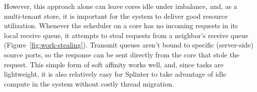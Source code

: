 However, this approach alone can leave cores idle under imbalance, and, as a multi-tenant
  store, it is important for the system to deliver good resource utilization.
Whenever the scheduler on a core has no
  incoming requests in its local receive queue, it attempts to steal requests
  from a neighbor's receive queue (Figure~\ref{fig:work-stealing}).
Transmit queues aren't bound to specific (server-side) source ports, so the
  response can be sent directly from the core that stole the request.
This simple form of soft affinity works well, and, since tasks are lightweight,
  it is also relatively easy for Splinter to take advantage of idle compute
  in the system without costly thread migration.
